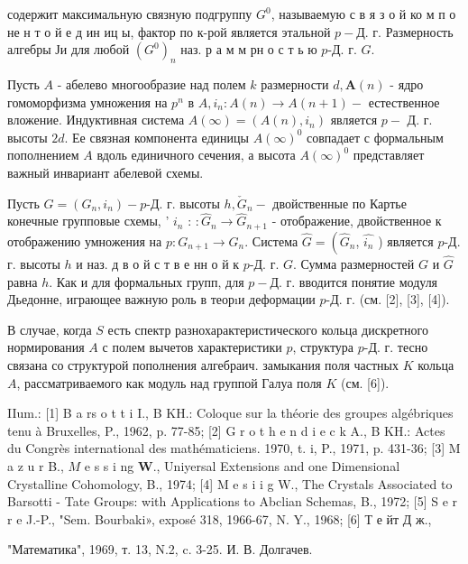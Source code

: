 \documentclass[10pt]{article}
\begin{document}
содержит максимальную связную подгруппу $G^{0}$, называемую с в я з о й ко м п о не н т о й е д ин иц ы, фактор по к-рой является этальной $p-Д$. г. Размерность алгебры Ји для любой $\left(G^{0}\right)_{n}$ наз. р а м м рн о с т ь ю $p$-Д. г. $G$.



Пусть $A$ - абелево многообразие над полем $k$ размерности $d, \boldsymbol{A}(n)$ - ядро гомоморфизма умножения на $p^{n}$ в $A, i_{n}: A(n) \rightarrow A(n+1)-$ естественное вложение. Индуктивная система $A(\infty)=\left(A(n), i_{n}\right)$ является $p-$ Д. г. высоты $2 d$. Ее связная компонента единицы $A(\infty)^{0}$ совпадает с формальным пополнением $A$ вдоль единичного сечения, а высота $A(\infty)^{0}$ представляет важный инвариант абелевой схемы.



Пусть $G=\left(G_{n}, i_{n}\right)-p$-Д. г. высоты $h, \check{G}_{n}-$ двойственные по Картье конечные групповые схемы, ' $i_{n}$ : $: \widehat{G}_{n} \rightarrow \widehat{G}_{n+1}$ - отображение, двойственное к отображению умножения на $p: G_{n+1} \rightarrow G_{n}$. Система $\widehat{G}=\left(\widehat{G}_{n}\right.$, $\hat{i_{n}}$ ) является $p$-Д. г. высоты $h$ и наз. д в о й с т в е нн о й к $p$-Д. г. $G$. Сумма размерностей $G$ и $\hat{G}$ равна $h$. Как и для формальных групп, для $p-Д$. г. вводится понятие модуля Дьедонне, играющее важную роль в теорıи деформации $p$-Д. г. (см. [2], [3], [4]).



В случае, когда $S$ есть спектр разнохарактеристического кольца дискретного нормирования $A$ с полем вычетов характеристики $p$, структура $p$-Д. г. тесно связана со структурой пополнения алгебраич. замыкания поля частных $K$ кольца $A$, рассматриваемого как модуль над группой Галуа поля $K$ (см. [6]).



IIum.: [1] B a rs o t t i I., B KH.: Coloque sur la théorie des groupes algébriques tenu à Bruxelles, P., 1962, p. 77-85; [2] G r o t h e n d i e c k A., B KH.: Actes du Congrès international des mathématiciens. 1970, t. i, P., 1971, p. 431-36; [3] M a z u r B., $M$ e s s i ng $\mathbf{W}$., Uniyersal Extensions and one Dimensional Crystalline Cohomology, B., 1974; [4] M e s i i g W., The Crystals Associated to Barsotti - Tate Groups: with Applications to Abclian Schemas, B., 1972; [5] S e r r e J.-P., "Sem. Bourbaki», exposé 318, 1966-67, N. Y., 1968; [6] Т е йт Д ж.,

"Математика", 1969, т. 13, N.2, c. 3-25. И. В. Долгачев.
\end{document}
